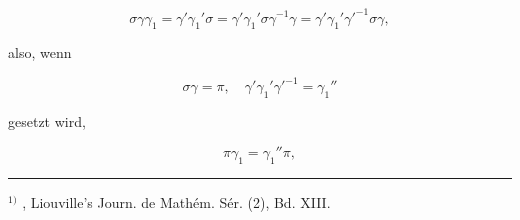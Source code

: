 \[
\sigma\gamma\gamma_1 = \gamma'\gamma_1'\sigma = \gamma'\gamma_1'\sigma\gamma^{-1}\gamma = \gamma'\gamma_1'\gamma'^{-1}\sigma\gamma,
\]

also, wenn

\[
\sigma\gamma = \pi, \quad \gamma'\gamma_1'\gamma'^{-1} = \gamma_1''
\]

gesetzt wird,

\[
\pi\gamma_1 = \gamma_1''\pi,
\]

\begin{center}
\rule{4cm}{0.4pt}
\end{center}

$^{1)}$ , Liouville's Journ. de Math\'em. S\'er. (2), Bd. XIII.
